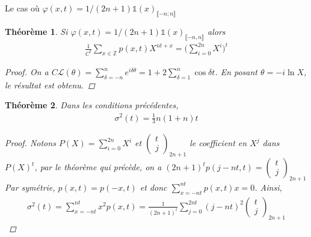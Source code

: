 \documentclass{article}
\newtheorem{theorem}{Théorème}[section]
\theoremstyle{definition}
\begin{document}
\begin{section}{Le cas où $\varphi(x, t) = 1/(2n+1)\mathds{1}(x)_{\llbracket -n; n\rrbracket}$}
\begin{theorem}
	Si $\varphi(x, t) =1/(2n+1)\mathds{1}(x)_{\llbracket -n,n\rrbracket}$ alors 
	\begin{align*}
	  \frac{1}{C^t} \sum_{x\in\mathbb{Z}}p(x,t) X^{nt+x} = \bigg(\sum_{i=0}^{2n} X^i\bigg)^t\end{align*}
	  \begin{proof}
		  On a $C\mathcal{L}(\theta) = \sum_{\delta=-n}^{n} e^{i\delta \theta} = 1 + 2\sum_{\delta=1}^n \cos \delta t$. En posant $\theta = -i \ln X$, le résultat est obtenu.

	  \end{proof}
\end{theorem}
\begin{theorem}
	Dans les conditions précédentes,  
	\begin{align*}
		\sigma^2(t) = \frac{1}{3} n (1+n) t
	\end{align*}
	\begin{proof}
		Notons $P(X) = \sum_{i=0}^{2n} X^i$ et $\begin{pmatrix}t\\j\end{pmatrix}_{2n+1}$ le coefficient en $X^j$ dans $P(X)^t$, par le théorème qui précède, on a $(2n+1)^t p(j-nt,t) = \begin{pmatrix} t\\j \end{pmatrix}_{2n+1}$
		Par symétrie, $p(x,t) = p(-x,t)$ et donc $\sum_{x=-n t}^{n t} p(x,t) x = 0$. Ainsi, \begin{align*}
			\sigma^2(t) = \sum_{x=-nt}^{nt} x^2 p(x,t) = \frac{1}{(2n+1)^t} \sum_{j=0}^{2nt} (j-nt)^2 \begin{pmatrix}t\\j\end{pmatrix}_{2n+1} 
		\end{align*}


\end{proof}
\end{theorem}
\end{section}
\end{document}
